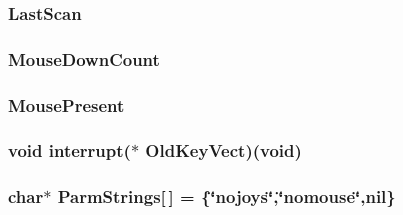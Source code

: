 \label{ID__IN_8C_a767f91c4e83781f8bea2b3e65e2fa142}
\hypertarget{ID__IN_8C_a294d54f35598c13b2caa8bee664743a4}{
\subsubsection[{LastScan}]{ {\bf LastScan}}}
\label{ID__IN_8C_a294d54f35598c13b2caa8bee664743a4}
\hypertarget{ID__IN_8C_a2623f228936e38b5463eeb42e057b634}{
\subsubsection[{MouseDownCount}]{ {\bf MouseDownCount}}}
\label{ID__IN_8C_a2623f228936e38b5463eeb42e057b634}
\hypertarget{ID__IN_8C_acfbb4437bdf4555f53ac0b13925b6d32}{
\subsubsection[{MousePresent}]{ {\bf MousePresent}}}
\label{ID__IN_8C_acfbb4437bdf4555f53ac0b13925b6d32}
\hypertarget{ID__IN_8C_ada5c331955ba1fc092fbf5ed7fb2f85f}{
\subsubsection[{OldKeyVect}]{\setlength{\rightskip}{0pt plus 5cm}void interrupt($\ast$ {\bf OldKeyVect})(void)}}
\label{ID__IN_8C_ada5c331955ba1fc092fbf5ed7fb2f85f}
\hypertarget{ID__IN_8C_af8599e1c1fbb3afabbdaa22e7c4a94b0}{
\subsubsection[{ParmStrings}]{\setlength{\rightskip}{0pt plus 5cm}char$\ast$ {\bf ParmStrings}\mbox{[}$\,$\mbox{]} = \{\char`\"{}nojoys\char`\"{},\char`\"{}nomouse\char`\"{},nil\}}}
